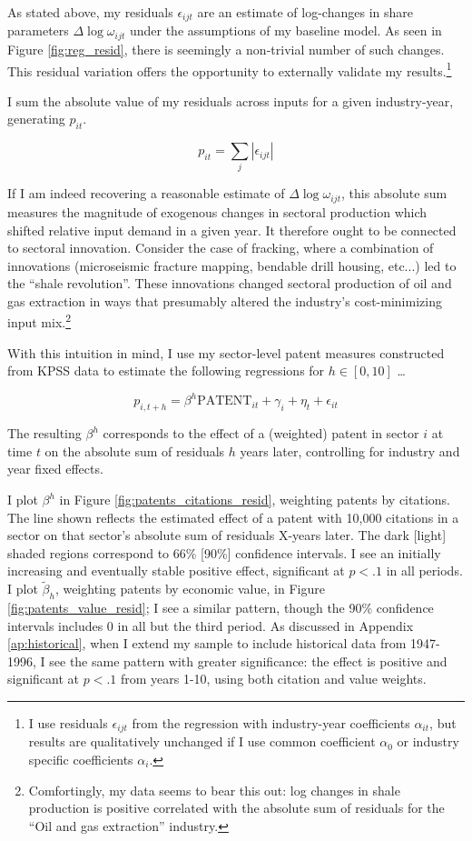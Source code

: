 \documentclass[11pt]{article}
\begin{document}
As stated above, my residuals $\epsilon_{ijt}$ are an estimate of log-changes in share parameters $\Delta \log \omega_{ijt}$ under the assumptions of my baseline model. As seen in Figure \ref{fig:reg_resid}, there is seemingly a non-trivial number of such changes. This residual variation offers the opportunity to externally validate my results.\footnote{I use residuals $\epsilon_{ijt}$ from the regression with industry-year coefficients $\alpha_{it}$, but results are qualitatively unchanged if I use common coefficient $\alpha_0$ or industry specific coefficients $\alpha_i$.} 

I sum the absolute value of my residuals across inputs for a given industry-year, generating $p_{it}$.

\[
p_{it} = \sum_j |{\epsilon_{ijt}}| 
\]

If I am indeed recovering a reasonable estimate of $\Delta \log \omega_{ijt}$, this absolute sum measures the magnitude of exogenous changes in sectoral production which shifted relative input demand in a given year. It therefore ought to be connected to sectoral innovation. Consider the case of fracking, where a combination of innovations (microseismic fracture mapping, bendable drill housing, etc...) led to the ``shale revolution''. These innovations changed sectoral production of oil and gas extraction in ways that presumably altered the industry's cost-minimizing input mix.\footnote{Comfortingly, my data seems to bear this out: log changes in shale production is positive correlated with the absolute sum of residuals for the ``Oil and gas extraction'' industry.}

With this intuition in mind, I use my sector-level patent measures constructed from KPSS data to estimate the following regressions for $h\in[0,10]$ \dots 

\[
p_{i,t+h} = \beta^h \text{PATENT}_{it} + \gamma_i + \eta_t + \epsilon_{it}
\]

The resulting $\beta^h$ corresponds to the effect of a (weighted) patent in sector $i$ at time $t$ on the absolute sum of residuals $h$ years later, controlling for industry and year fixed effects. 

I plot $\beta^h$ in Figure \ref{fig:patents_citations_resid}, weighting patents by citations. The line shown reflects the estimated effect of a patent with 10,000 citations in a sector on that sector's absolute sum of residuals X-years later. The dark [light] shaded regions correspond to 66\% [90\%] confidence intervals. I see an initially increasing and eventually stable positive effect, significant at $p<.1$ in all periods. I plot $\tilde{\beta}_h$, weighting patents by economic value, in Figure \ref{fig:patents_value_resid}; I see a similar pattern, though the 90\% confidence intervals includes 0 in all but the third period. As discussed in Appendix \ref{ap:historical}, when I extend my sample to include historical data from 1947-1996, I see the same pattern with greater significance: the effect is positive and significant at $p<.1$ from years 1-10, using both citation and value weights.
\end{document}
